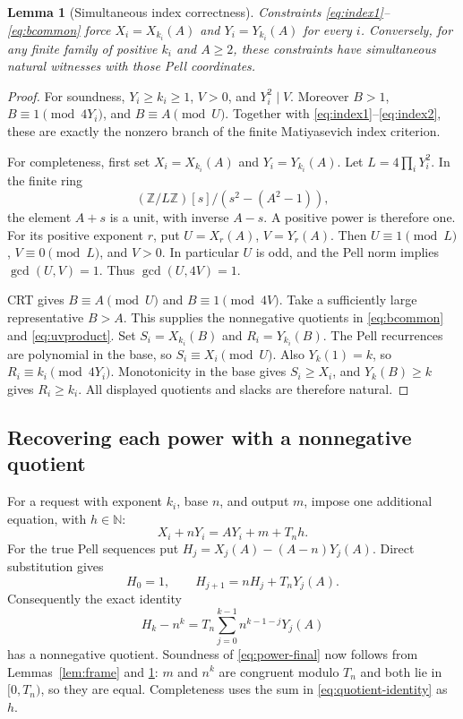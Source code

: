 \documentclass[11pt,letterpaper]{article}
\newtheorem{lemma}[theorem]{Lemma}
\theoremstyle{definition}\newtheorem{definition}[theorem]{Definition}
\theoremstyle{remark}\newtheorem{remark}[theorem]{Remark}
\newcommand{\N}{\mathbb N}
\newcommand{\Z}{\mathbb Z}
\begin{document}
\begin{lemma}[Simultaneous index correctness]\label{lem:index}
Constraints \eqref{eq:index1}--\eqref{eq:bcommon} force
$X_i=X_{k_i}(A)$ and $Y_i=Y_{k_i}(A)$ for every $i$. Conversely, for
any finite family of positive $k_i$ and $A\ge2$, these constraints have
simultaneous natural witnesses with those Pell coordinates.
\end{lemma}
\begin{proof}
For soundness, $Y_i\ge k_i\ge1$, $V>0$, and $Y_i^2\mid V$.
Moreover $B>1$, $B\equiv1\pmod{4Y_i}$, and $B\equiv A\pmod U$.
Together with \eqref{eq:index1}--\eqref{eq:index2}, these are exactly
the nonzero branch of the finite Matiyasevich index criterion.

For completeness, first set $X_i=X_{k_i}(A)$ and $Y_i=Y_{k_i}(A)$.
Let $L=4\prod_iY_i^2$. In the finite ring
\[
 (\Z/L\Z)[s]/(s^2-(A^2-1)),
\]
the element $A+s$ is a unit, with inverse $A-s$. A positive power is
therefore one. For its positive exponent $r$, put
$U=X_r(A)$, $V=Y_r(A)$. Then $U\equiv1\pmod L$, $V\equiv0\pmod L$,
and $V>0$. In particular $U$ is odd, and the Pell norm implies
$\gcd(U,V)=1$. Thus $\gcd(U,4V)=1$.

CRT gives $B\equiv A\pmod U$ and $B\equiv1\pmod{4V}$. Take a
sufficiently large representative $B>A$. This supplies the nonnegative
quotients in \eqref{eq:bcommon} and \eqref{eq:uvproduct}.
Set $S_i=X_{k_i}(B)$ and $R_i=Y_{k_i}(B)$. The Pell recurrences are
polynomial in the base, so $S_i\equiv X_i\pmod U$. Also
$Y_k(1)=k$, so $R_i\equiv k_i\pmod{4Y_i}$. Monotonicity in the base
gives $S_i\ge X_i$, and $Y_k(B)\ge k$ gives $R_i\ge k_i$.
All displayed quotients and slacks are therefore natural.
\end{proof}

\subsection{Recovering each power with a nonnegative quotient}

For a request with exponent $k_i$, base $n$, and output $m$, impose
one additional equation, with $h\in\N$:
\begin{equation}\label{eq:power-final}
 X_i+nY_i=AY_i+m+T_nh.
\end{equation}
For the true Pell sequences put $H_j=X_j(A)-(A-n)Y_j(A)$. Direct
substitution gives
\[
 H_0=1,\qquad H_{j+1}=nH_j+T_nY_j(A).
\]
Consequently the exact identity
\begin{equation}\label{eq:quotient-identity}
 H_k-n^k=T_n\sum_{j=0}^{k-1}n^{k-1-j}Y_j(A)
\end{equation}
has a nonnegative quotient. Soundness of \eqref{eq:power-final} now
follows from Lemmas~\ref{lem:frame} and \ref{lem:index}: $m$ and $n^k$
are congruent modulo $T_n$ and both lie in $[0,T_n)$, so they are equal.
Completeness uses the sum in \eqref{eq:quotient-identity} as $h$.
\end{document}
